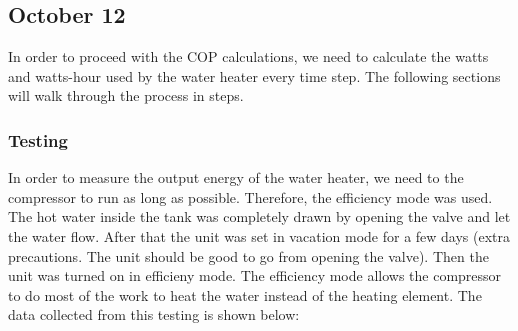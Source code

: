 \subsection{October 12}
In order to proceed with the COP calculations, we need to calculate the watts and watts-hour used by the water heater every time step. The following sections will walk through the process in steps.
\subsubsection{Testing}

In order to measure the output energy of the water heater, we need to the compressor to run as long as possible. Therefore, the efficiency mode was used. The hot water inside the tank was completely drawn by opening the valve and let the water flow. After that the unit was set in vacation mode for a few days (extra precautions. The unit should be good to go from opening the valve). Then the unit was turned on in efficieny mode. The efficiency mode allows the compressor to do most of the work to heat the water instead of the heating element. The data collected from this testing is shown below:


